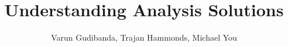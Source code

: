\documentclass{article}
\title{Understanding Analysis Solutions}
\author{Varun Gudibanda, Trajan Hammonds, Michael You}
\date{}
\begin{document}
\begin{titlingpage}
\maketitle
\end{titlingpage}




\end{document}
